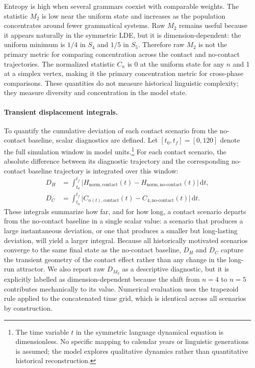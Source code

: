 \documentclass[11pt]{article}
\begin{document}
Entropy is high when several grammars coexist with comparable weights. The statistic $M_2$ is low near the uniform state and increases as the population concentrates around fewer grammatical systems. Raw $M_2$ remains useful because it appears naturally in the symmetric LDE, but it is dimension-dependent: the uniform minimum is $1/4$ in $S_4$ and $1/5$ in $S_5$. Therefore raw $M_2$ is not the primary metric for comparing concentration across the contact and no-contact trajectories. The normalized statistic $C_n$ is 0 at the uniform state for any $n$ and 1 at a simplex vertex, making it the primary concentration metric for cross-phase comparisons. These quantities do not measure historical linguistic complexity; they measure diversity and concentration in the model state.

\paragraph*{Transient displacement integrals.}
To quantify the cumulative deviation of each contact scenario from the no-contact baseline, scalar diagnostics are defined. Let $[t_0, t_f] = [0, 120]$ denote the full simulation window in model units.\footnote{The time variable $t$ in the symmetric language dynamical equation is dimensionless. No specific mapping to calendar years or linguistic generations is assumed; the model explores qualitative dynamics rather than quantitative historical reconstruction.} For each contact scenario, the absolute difference between its diagnostic trajectory and the corresponding no-contact baseline trajectory is integrated over this window:
\begin{align}
    D_H &= \int_{t_0}^{t_f}
             \bigl|H_{\mathrm{norm,contact}}(t) - H_{\mathrm{norm,no\text{-}contact}}(t)\bigr|
             \,\mathrm{d}t,
    \label{eq:dH} \\
    D_C &= \int_{t_0}^{t_f}
               \bigl|C_{n(t),\mathrm{contact}}(t) - C_{4,\mathrm{no\text{-}contact}}(t)\bigr|
               \,\mathrm{d}t.
    \label{eq:dC}
\end{align}
These integrals summarize how far, and for how long, a contact scenario departs from the no-contact baseline in a single scalar value: a scenario that produces a large instantaneous deviation, or one that produces a smaller but long-lasting deviation, will yield a larger integral. Because all historically motivated scenarios converge to the same final state as the no-contact baseline, $D_H$ and $D_C$ capture the transient geometry of the contact effect rather than any change in the long-run attractor. We also report raw $D_{M_2}$ as a descriptive diagnostic, but it is explicitly labelled as dimension-dependent because the shift from $n=4$ to $n=5$ contributes mechanically to its value. Numerical evaluation uses the trapezoid rule applied to the concatenated time grid, which is identical across all scenarios by construction.
\end{document}
